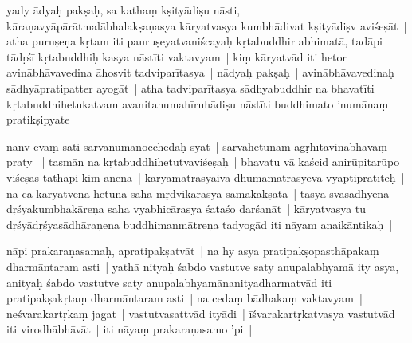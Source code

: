 \documentclass[article,a4paper]{memoir}
\newcommand{\add}[1]{($^{+}$#1)}
\begin{document}
	  \pstart yady ā\-dyaḥ pakṣaḥ, sa kathaṃ kṣityā\-diṣu nā\-sti, kā\-raṇavyā\-pā\-rā\-tmalā\-bhalakṣaṇasya kā\-ryatvasya kumbhā\-divat kṣityā\-diṣv aviśeṣā\-t | atha puruṣeṇa kṛtam iti pauruṣeyatvaniścayaḥ kṛtabuddhir abhimatā\-, tadā\-pi tā\-dṛśī\- kṛtabuddhiḥ kasya nā\-stī\-ti vaktavyam | kiṃ kā\-ryatvā\-d iti hetor avinā\-bhā\-vavedina ā\-hosvit tadviparī\-tasya | nā\-dyaḥ pakṣaḥ | avinā\-bhā\-vavedinaḥ sā\-dhyā\-pratipatter ayogā\-t | atha tadviparī\-tasya sā\-dhyabuddhir na bhavatī\-ti kṛtabuddhihetukatvam avanitanumahī\-ruhā\-diṣu nā\-stī\-ti buddhimato 'numā\-naṃ pratikṣipyate |
	\pend
      

	  \pstart nanv evaṃ sati sarvā\-numā\-nocchedaḥ syā\-t | sarvahetū\-nā\-m agṛhī\-tā\-vinā\-bhā\-vaṃ praty \edtext{agamakatvāt}{\Afootnote{agama\add{ka}tvā\-t \cite{}; agamakatvā\-t \cite{}}} | tasmā\-n na \label{rnā__99759}kṛtabuddhihetutvaviśeṣaḥ\label{rnā__99814} | bhavatu vā\- kaścid anirū\-pitarū\-po viśeṣas tathā\-pi kim anena | kā\-ryamā\-trasyaiva dhū\-mamā\-trasyeva vyā\-ptipratī\-teḥ | na ca kā\-ryatvena hetunā\- saha mṛdvikā\-rasya samakakṣatā\- | tasya svasā\-dhyena dṛśyakumbhakā\-reṇa saha vyabhicā\-rasya śataśo darśanā\-t | kā\-ryatvasya tu dṛśyā\-dṛśyasā\-dhā\-raṇena buddhimanmā\-treṇa tadyogā\-d iti nā\-yam anaikā\-ntikaḥ |
	\pend
      

	  \pstart nā\-pi prakaraṇasamaḥ, apratipakṣatvā\-t | na hy asya pratipakṣopasthā\-pakaṃ dharmā\-ntaram asti | \label{RNAms-add-1-start}yathā\- nityaḥ śabdo vastutve saty anupalabhyamā\- ity asya, anityaḥ śabdo vastutve saty anupalabhyamā\-nanityadharmatvā\-d iti pratipakṣakṛtaṃ dharmā\-ntaram asti |\label{RNAms-add-1-end} na cedaṃ bā\-dhakaṃ vaktavyam | neśvarakartṛkaṃ jagat | vastutvasattvā\-d ityā\-di | ī\-śvarakartṛkatvasya vastutvā\-d iti virodhā\-bhā\-vā\-t | iti nā\-yaṃ prakaraṇasamo 'pi |
	\pend
      
\end{document}
